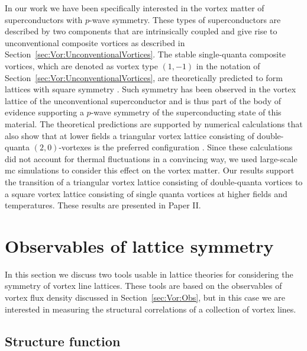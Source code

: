 In our work we have been specifically interested in the vortex matter of superconductors with $p$-wave symmetry. These types of superconductors are described by two components that are intrinsically
coupled and give rise to unconventional composite vortices as described in Section~\ref{sec:Vor:UnconventionalVortices}. The stable single-quanta composite vortices, which are denoted
as vortex type $(1, -1)$ in the notation of Section~\ref{sec:Vor:UnconventionalVortices}, are theoretically predicted to form lattices with square symmetry \cite{Agterberg00,Heeb99,AgterbergVortex98}.
Such symmetry has been observed in the vortex lattice of the unconventional superconductor  \cite{Riseman98,Aegerter98,Ray14,Curran11} and is thus part of the body of evidence
supporting a $p$-wave symmetry of the superconducting state of this material. The theoretical predictions are supported by numerical calculations that also show that at lower fields
a triangular vortex lattice consisting of double-quanta $(2,0)$-vortexes is the preferred configuration \cite{AsleGaraud16}. Since these calculations did not account for thermal fluctuations in
a convincing way, we used large-scale \ac{mc} simulations to consider this effect on the vortex matter. Our results support the transition of a triangular vortex lattice consisting of
double-quanta vortices to a square vortex lattice consisting of single quanta vortices at higher fields and temperatures. These results are presented in Paper II.

\section{Observables of lattice symmetry}
\label{sec:Vor:Symm}

In this section we discuss two tools usable in lattice theories for considering the symmetry of vortex line lattices. These tools are based on the observables of vortex flux density discussed
in Section~\ref{sec:Vor:Obs}, but in this case we are interested in measuring the structural correlations of a collection of vortex lines.

\subsection{Structure function}
\label{sec:Vor:Symm:SF}

